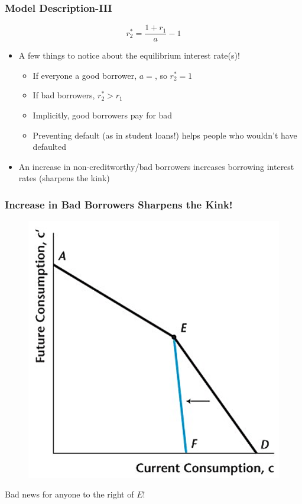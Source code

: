 \documentclass{beamer}
\begin{document}
\begin{frame}
\frametitle[alignment=center]{Model Description-III}
$$r_2^*=\frac{1+r_1}{a}-1$$
\begin{itemize}
\item A few things to notice about the equilibrium interest rate(s)!
\begin{itemize}
\item If everyone a good borrower, $a=$, so $r_2^*=1$
\bigskip
\item If bad borrowers, $r_2^*>r_1$
\bigskip
\item Implicitly, good borrowers pay for bad
\bigskip
\item Preventing default (as in student loans!) helps people who wouldn't have defaulted
\end{itemize}
\item An increase in non-creditworthy/bad borrowers increases borrowing interest rates (sharpens the kink)
\end{itemize}
\end{frame}

\begin{frame}
\frametitle[alignment=center]{Increase in Bad Borrowers Sharpens the Kink!}
\begin{figure}
\includegraphics[scale=0.5]{Figures/W_Fig_10pt3.png}
\end{figure}
Bad news for anyone to the right of $E$!
\end{frame}
\end{document}

